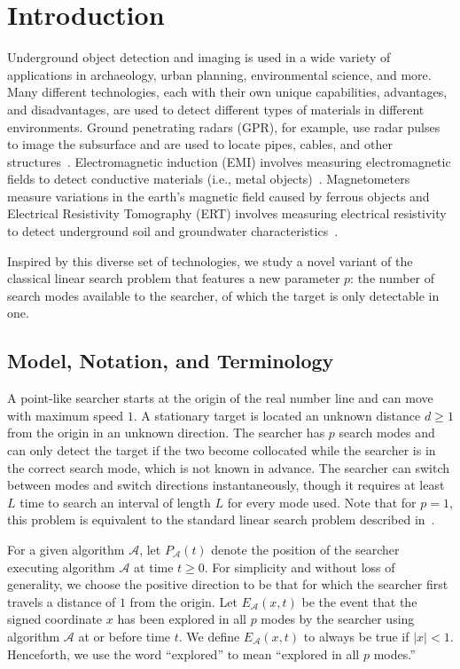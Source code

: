 

\section{Introduction}

Underground object detection and imaging is used in a wide variety of applications in archaeology, urban planning, environmental science, and more.
Many different technologies, each with their own unique capabilities, advantages, and disadvantages, are used to detect different types of materials in different environments.
Ground penetrating radars (GPR), for example, use radar pulses to image the subsurface and are used to locate pipes, cables, and other structures~\cite{uod:gpr}.
Electromagnetic induction (EMI) involves measuring electromagnetic fields to detect conductive materials (i.e., metal objects)~\cite{uod:emi}.
Magnetometers measure variations in the earth's magnetic field caused by ferrous objects and Electrical Resistivity Tomography (ERT) involves measuring electrical resistivity to detect underground soil and groundwater characteristics~\cite{uod:ert}.

Inspired by this diverse set of technologies, we study a novel variant of the classical linear search problem that features a new parameter $p$: the number of search modes available to the searcher, of which the target is only detectable in one.

\subsection{Model, Notation, and Terminology}

A point-like searcher starts at the origin of the real number line and can move with maximum speed $1$.
A stationary target is located an unknown distance $d \geq 1$ from the origin in an unknown direction.
The searcher has $p$ search modes and can only detect the target if the two become collocated while the searcher is in the correct search mode, which is not known in advance. 
The searcher can switch between modes and switch directions instantaneously, though it requires at least $L$ time to search an interval of length $L$ for every mode used.
Note that for $p=1$, this problem is equivalent to the standard linear search problem described in~\cite{beck1970linearsearch}.


For a given algorithm $\mathcal{A}$, let $P_{\mathcal{A}}(t)$ denote the position of the searcher executing algorithm $\mathcal{A}$ at time $t \geq 0$.
For simplicity and without loss of generality, we choose the positive direction to be that for which the searcher first travels a distance of $1$ from the origin. Let $E_{\mathcal{A}}(x,t)$ be the event that the signed coordinate $x$ has been explored in all $p$ modes by the searcher using algorithm $\mathcal{A}$ at or before time $t$. We define $E_{\mathcal{A}}(x,t)$ to always be true if $|x|<1$. 
Henceforth, we use the word ``explored'' to mean ``explored in all $p$ modes.''

